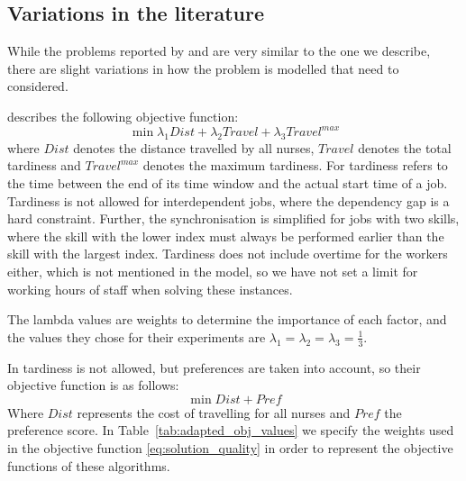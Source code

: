 \documentclass[a4paper,11pt]{elsarticle}
\begin{document}
\subsection{Variations in the literature}\label{seq:literature data}
While the problems reported by \cite{Mankowska2014} and \cite{AitHaddadene2016} are very similar to the one we describe, there are slight variations in how the problem is modelled that need to considered.

\cite{Mankowska2014} describes the following objective function:
\begin{equation}
    \min \lambda_1 Dist + \lambda_2 Travel + \lambda_3 Travel^{max}
\end{equation}
where $Dist$ denotes the distance travelled by all nurses, $Travel$ denotes the total tardiness and $Travel^{max}$ denotes the maximum tardiness. For \cite{Mankowska2014} tardiness refers to the time between the end of its time window and the actual start time of a job. Tardiness is not allowed for interdependent jobs, where the dependency gap is a hard constraint. Further, the synchronisation is simplified for jobs with two skills, where the skill with the lower index must always be performed earlier than the skill with the largest index.
Tardiness does not include overtime for the workers either, which is not mentioned in the model, so we have not set a limit for working hours of staff when solving these instances.

The lambda values are weights to determine the importance of each factor, and the values they chose for their experiments are $\lambda_1 = \lambda_2 = \lambda_3 = \frac{1}{3}$.

In \cite{AitHaddadene2016} tardiness is not allowed, but preferences are taken into account, so their objective function is as follows:
\begin{equation}
    \min Dist + Pref
\end{equation}
Where $Dist$ represents the cost of travelling for all nurses and $Pref$ the preference score.
In Table~\ref{tab:adapted_obj_values} we specify the weights used in the objective function \eqref{eq:solution_quality} in order to represent the objective functions of these algorithms.
\end{document}
